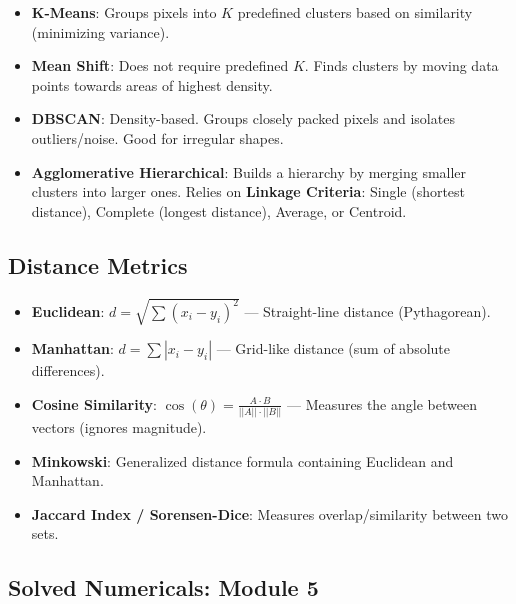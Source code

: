 \documentclass[11pt,a4paper]{article}
\begin{document}
\begin{itemize}
    \item \textbf{K-Means}: Groups pixels into $K$ predefined clusters based on similarity (minimizing variance).
    \item \textbf{Mean Shift}: Does not require predefined $K$. Finds clusters by moving data points towards areas of highest density.
    \item \textbf{DBSCAN}: Density-based. Groups closely packed pixels and isolates outliers/noise. Good for irregular shapes.
    \item \textbf{Agglomerative Hierarchical}: Builds a hierarchy by merging smaller clusters into larger ones. Relies on \textbf{Linkage Criteria}: Single (shortest distance), Complete (longest distance), Average, or Centroid.
\end{itemize}

\subsection{Distance Metrics}

\begin{itemize}
    \item \textbf{Euclidean}: $d = \sqrt{\sum (x_i - y_i)^2}$ --- Straight-line distance (Pythagorean).
    \item \textbf{Manhattan}: $d = \sum |x_i - y_i|$ --- Grid-like distance (sum of absolute differences).
    \item \textbf{Cosine Similarity}: $\cos(\theta) = \frac{A \cdot B}{||A|| \cdot ||B||}$ --- Measures the angle between vectors (ignores magnitude).
    \item \textbf{Minkowski}: Generalized distance formula containing Euclidean and Manhattan.
    \item \textbf{Jaccard Index / Sorensen-Dice}: Measures overlap/similarity between two sets.
\end{itemize}

\subsection{Solved Numericals: Module 5}
\end{document}

